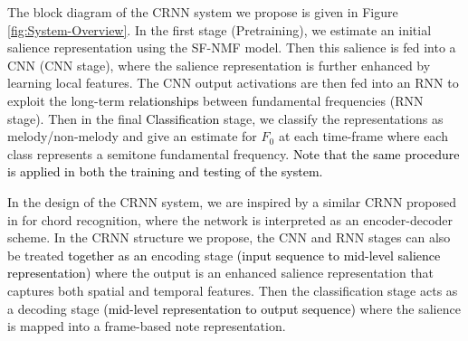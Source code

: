 \documentclass{article}
\newcommand{\gp}[1]{{\textcolor{black}{#1}}}
\newcommand{\db}[1]{{\textcolor{black}{#1}}}
\newcommand{\jb}[1]{{\textcolor{black}{#1}}}
\newcommand{\jbcor}[2]{{\textcolor{black}{#2}}}
\begin{document}
The block diagram of the CRNN system we propose is given in Figure \ref{fig:System-Overview}. 
In the first stage (Pretraining), we estimate an initial salience representation using the SF-NMF model. Then this salience is fed into a
CNN (CNN stage),
where the salience representation is further enhanced by learning local features. The CNN output activations are then fed into an RNN
to exploit the long-term \jbcor{relations}{relationships} between fundamental frequencies (RNN stage). Then in the final \jb{Classification} stage, we classify the representations as melody/non-melody and give an estimate for $F_0$ at each time-frame where each class represents a semitone fundamental frequency. \db{Note that the same procedure is applied in both the training and testing \jb{of} the system.} 

In the design of the CRNN system, we are inspired by a similar CRNN proposed in \cite{mcfee_chord} for chord recognition, where the network is interpreted as an encoder-decoder scheme. In the CRNN structure we propose, the CNN and RNN stages can also be treated \jbcor{as a total}{together as an} encoding stage \jb{(}\db{input sequence to mid-level salience representation}\jb{)} where the output is an enhanced salience representation that captures both spatial and temporal features. Then the classification stage acts as a decoding stage \db{(mid-level representation to output sequence)} where the salience is mapped into a frame-based note representation. 
\end{document}
